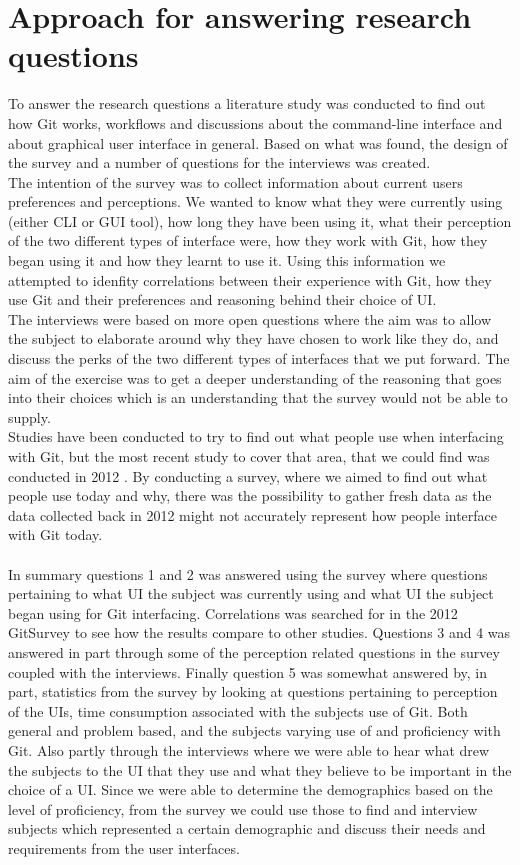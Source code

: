 \documentclass[a4paper,oneside]{bth} %
\begin{document}
			\section{Approach for answering research questions}
			To answer the research questions a literature study was conducted to find out how Git works, workflows and discussions about the command-line interface and about graphical user interface in general. Based on what was found, the design of the survey and a number of questions for the interviews was created.\\
			The intention of the survey was to collect information about current users preferences and perceptions. We wanted to know what they were currently using (either CLI or GUI tool), how long they have been using it, what their perception of the two different types of interface were, how they work with Git, how they began using it and how they learnt to use it. 
			Using this information we attempted to idenfity correlations between their experience with Git, how they use Git and their preferences and reasoning behind their choice of UI.\\
			The interviews were based on more open questions where the aim was to allow the subject to elaborate around why they have chosen to work like they do, and discuss the perks of the two different types of interfaces that we put forward. The aim of the exercise was to get a deeper understanding of the reasoning that goes into their choices which is an understanding that the survey would not be able to supply.\\
			Studies have been conducted to try to find out what people use when interfacing with Git, but the most recent study to cover that area, that we could find was conducted in 2012 \cite{GitUserSurvey}.
			By conducting a survey, where we aimed to find out what people use today and why, there was the possibility to gather fresh data as the data collected back in 2012 might not accurately represent how people interface with Git today.
			\\\\
			In summary questions 1 and 2 was answered using the survey where questions pertaining to what UI the subject was currently using and what UI the subject began using for Git interfacing. Correlations was searched for in the 2012 GitSurvey \cite{GitUserSurvey} to see how the results compare to other studies.
			Questions 3 and 4 was answered in part through some of the perception related questions in the survey coupled with the interviews. Finally question 5 was somewhat answered by, in part, statistics from the survey by looking at questions pertaining to perception of the UIs, time consumption associated with the subjects use of Git. Both general and problem based, and the subjects varying use of and proficiency with Git. Also partly through the interviews where we were able to hear what drew the subjects to the UI that they use and what they believe to be important in the choice of a UI. Since we were able to determine the demographics based on the level of proficiency, from the survey we could use those to find and interview subjects which represented a certain demographic and discuss their needs and requirements from the user interfaces. 
\end{document}
